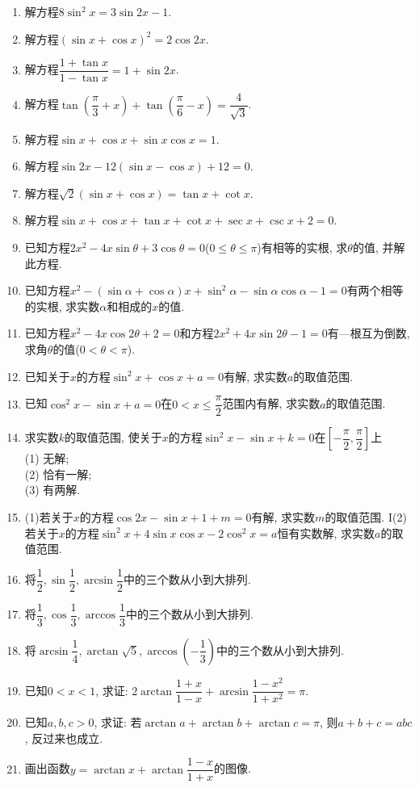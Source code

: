 \documentclass[10pt,a4paper]{article}
\begin{document}
\begin{enumerate}[1.]
\item 解方程$8\sin ^2x=3\sin 2x-1$.
\item 解方程$(\sin x+\cos x)^2=2\cos 2x$.
\item 解方程$\dfrac{1+\tan x}{1-\tan x}=1+\sin 2x$.
\item 解方程$\tan (\dfrac{\pi }3+x)+\tan (\dfrac{\pi }6-x)=\dfrac 4{\sqrt 3}$.
\item 解方程$\sin x+\cos x+\sin x\cos x=1$.
\item 解方程$\sin 2x-12(\sin x-\cos x)+12=0$.
\item 解方程$\sqrt 2(\sin x+\cos x)=\tan x+\cot x$.
\item 解方程$\sin x+\cos x+\tan x+\cot x+\sec x+\csc x+2=0$.
\item 已知方程$2x^2-4x\sin \theta +3\cos \theta =0$($0\le \theta \le \pi$)有相等的实根, 求$\theta$的值, 并解此方程.
\item 已知方程$x^2-(\sin \alpha +\cos \alpha)x+\sin ^2\alpha -\sin \alpha \cos \alpha -1=0$有两个相等的实根, 求实数$\alpha$和相成的$x$的值.
\item 已知方程$x^2-4x\cos 2\theta +2=0$和方程$2x^2+4x\sin 2\theta -1=0$有—根互为倒数, 求角$\theta$的值($0<\theta <\pi$).
\item 已知关于$x$的方程$\sin ^2x+\cos x+a=0$有解, 求实数$a$的取值范围.
\item 已知$\cos ^2x-\sin x+a=0$在$0<x\le \dfrac{\pi }2$范围内有解, 求实数$a$的取值范围.
\item 求实数$k$的取值范围, 使关于$x$的方程$\sin ^2x-\sin x+k=0$在$[-\dfrac{\pi }2,\dfrac{\pi }2]$上\\
(1) 无解;\\
(2) 恰有一解;\\
(3) 有两解.
\item (1)若关于$x$的方程$\cos 2x-\sin x+1+m=0$有解, 求实数$m$的取值范围.
I(2)若关于$x$的方程$\sin ^2x+4\sin x\cos x-2\cos ^2x=a$恒有实数解, 求实数$a$的取值范围.
\item 将$\dfrac 12,\sin \dfrac 12,\arcsin \dfrac 12$中的三个数从小到大排列.
\item 将$\dfrac 13,\cos \dfrac 13,\arccos \dfrac 13$中的三个数从小到大排列.
\item 将$\arcsin \dfrac 14,\arctan \sqrt 5,\arccos (-\dfrac 13)$中的三个数从小到大排列.
\item 已知$0<x<1$, 求证: $2\arctan \dfrac{1+x}{1-x}+\arcsin \dfrac{1-x^2}{1+x^2}=\pi$.
\item 已知$a,b,c>0$, 求证: 若$\arctan a+\arctan b+\arctan c=\pi$, 则$a+b+c=abc$, 反过来也成立.
\item 画出函数$y=\arctan x+\arctan \dfrac{1-x}{1+x}$的图像.

\end{enumerate}
\end{document}
